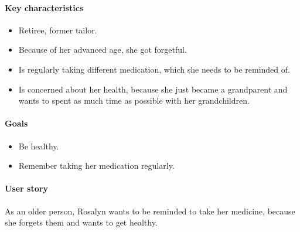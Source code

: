 \documentclass[conference]{IEEEtran}
\begin{document}
\paragraph*{Key characteristics}
\begin{itemize}[leftmargin=1.25cm]
	\item Retiree, former tailor.
	\item Because of her advanced age, she got forgetful.
	\item Is regularly taking different medication, which she needs to be reminded of.
	\item Is concerned about her health, because she just became a grandparent and wants to spent as much time as possible with her grandchildren.
\end{itemize}

\paragraph*{Goals}
\begin{itemize}[leftmargin=1.25cm]
	\item Be healthy.
	\item Remember taking her medication regularly.
\end{itemize}

\paragraph*{User story}
As an older person, Rosalyn wants to be reminded to take her medicine, because she forgets them and wants to get healthy.
\end{document}
